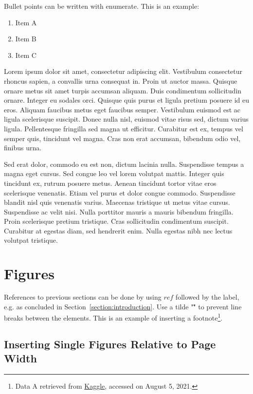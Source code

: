 \documentclass[a4paper, 11pt]{article}
\begin{document}
Bullet points can be written with enumerate. This is an example:

\begin{enumerate}
    \item Item A
    \item Item B
    \item Item C
\end{enumerate}

Lorem ipsum dolor sit amet, consectetur adipiscing elit. Vestibulum consectetur rhoncus sapien, a convallis urna consequat in. Proin ut auctor massa. Quisque ornare metus sit amet turpis accumsan aliquam. Duis condimentum sollicitudin ornare. Integer eu sodales orci. Quisque quis purus et ligula pretium posuere id eu eros. Aliquam faucibus metus eget faucibus semper. Vestibulum euismod est ac ligula scelerisque suscipit. Donec nulla nisl, euismod vitae risus sed, dictum varius ligula. Pellentesque fringilla sed magna ut efficitur. Curabitur est ex, tempus vel semper quis, tincidunt vel magna. Cras non erat accumsan, bibendum odio vel, finibus urna.

Sed erat dolor, commodo eu est non, dictum lacinia nulla. Suspendisse tempus a magna eget cursus. Sed congue leo vel lorem volutpat mattis. Integer quis tincidunt ex, rutrum posuere metus. Aenean tincidunt tortor vitae eros scelerisque venenatis. Etiam vel purus et dolor congue commodo. Suspendisse blandit nisl quis venenatis varius. Maecenas tristique ut metus vitae cursus. Suspendisse ac velit nisi. Nulla porttitor mauris a mauris bibendum fringilla. Proin scelerisque pretium tristique. Cras sollicitudin condimentum suscipit. Curabitur at egestas diam, sed hendrerit enim. Nulla egestas nibh nec lectus volutpat tristique.

\section{Figures}


References to previous sections can be done by using $ref$ followed by the label, e.g. as concluded in Section~\ref{section:introduction}. Use a tilde "\~" to prevent line breaks between the elements. This is an example of inserting a footnote\footnote{Data A retrieved from \href{https://kaggle.com/}{Kaggle}, accessed on August 5, 2021.}. 

\subsection{Inserting Single Figures Relative to Page Width}
\end{document}
